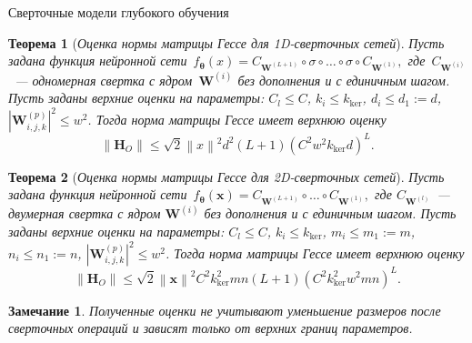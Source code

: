\documentclass[10pt,pdf,hyperref={unicode}]{beamer}
\newtheorem{rustheorem}{Теорема}
\newtheorem{rusremark}{Замечание}
\begin{document}
\begin{frame}{Сверточные модели глубокого обучения}
\justifying
\footnotesize
\begin{rustheorem}[\emph{Оценка нормы матрицы Гессе для 1D-сверточных сетей}]
    \justifying
    Пусть задана функция нейронной сети~$f_{\boldsymbol{\theta}}(x) = C_{\mathbf{W}^{(L+1)}} \circ \sigma \circ \dots \circ \sigma \circ C_{\mathbf{W}^{(1)}},$
    где~$C_{\mathbf{W}^{(i)}}$~--- одномерная свертка с ядром~$\mathbf{W}^{(i)}$ без дополнения и с единичным шагом.
    Пусть заданы верхние оценки на параметры: $C_l \leqslant C$, $k_i \leqslant k_{\mathrm{ker}}$, $d_i \leqslant d_1 := d$, $|\mathbf{W}^{(p)}_{i,j,k}|^2 \leqslant w^2$.
    Тогда норма матрицы Гессе имеет верхнюю оценку
    \[
        \left\|\mathbf{H}_{O}\right\| \leqslant \sqrt{2}\left\|x\right\|^2d^2(L+1)(C^2w^2k_{\mathrm{ker}}d)^L.
    \]
\end{rustheorem}

\begin{rustheorem}[\emph{Оценка нормы матрицы Гессе для 2D-сверточных сетей}]
    \justifying
    Пусть задана функция нейронной сети~$f_{\boldsymbol{\theta}}(\mathbf{x}) = C_{\mathbf{W}^{(L+1)}} \circ \dots \circ C_{\mathbf{W}^{(1)}},$
    где $C_{\mathbf{W}^{(l)}}$~--- двумерная свертка с ядром $\mathbf{W}^{(i)}$ без дополнения и с единичным шагом.
    Пусть заданы верхние оценки на параметры: $C_l \leqslant C$, $k_i \leqslant k_{\mathrm{ker}}$, $m_i \leqslant m_1 := m$, $n_i \leqslant n_1 := n$, $|\mathbf{W}^{(p)}_{i,j,k}|^2 \leqslant w^2$.
    Тогда норма матрицы Гессе имеет верхнюю оценку
    \[
        \left\|\mathbf{H}_{O}\right\| \leqslant \sqrt{2}\left\|\mathbf{x}\right\|^2C^2k_{\mathrm{ker}}^2mn(L+1)(C^2k_{\mathrm{ker}}^2w^2mn)^{L}.
    \]
\end{rustheorem}

\begin{rusremark}
    \justifying
    Полученные оценки не учитывают уменьшение размеров после сверточных операций и зависят только от верхних границ параметров.
\end{rusremark}
\end{frame}
\end{document}
